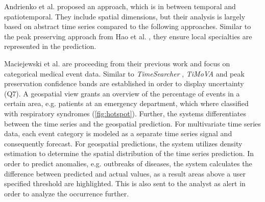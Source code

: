 \documentclass[electronic]{vgtc}             %
\begin{document}
Andrienko et al. \cite{Andrienko:2010} proposed an approach, which is in between temporal and spatiotemporal. 
They include spatial dimensions, but their analysis is largely based on abstract time series compared to the following approaches.
Similar to the peak preserving approach from Hao et al. \cite{Hao:2012}, they ensure local specialties are represented in the prediction. 

Maciejewski et al. \cite{maciejewski:2011} are proceeding from their previous work \cite{maciejewski:2008, maciejewski:2007} and focus on categorical medical event data.
Similar to \textit{TimeSearcher} \cite{buono:2007}, \textit{TiMoVA} \cite{boegl:2013} and peak preservation \cite{Hao:2012} confidence bands are established in order to display uncertainty (Q7).
A geospatial view grants an overview of the percentage of events in a certain area, e.g. patients at an emergency department, which where classified with respiratory syndromes (\autoref{fig:hotspot}).
Further, the systems differentiates between the time series and the geospatial prediction.
For multivariate time series data, each event category is modeled as a separate time series signal and consequently forecast. 
For geospatial predictions, the system utilizes density estimation to determine the spatial distribution of the time series prediction. 
In order to predict anomalies, e.g. outbreaks of diseases, the system calculates the difference between predicted and actual values, as a result areas above a user specified threshold are highlighted.
This is also sent to the analyst as alert in order to analyze the occurrence further.
\end{document}
